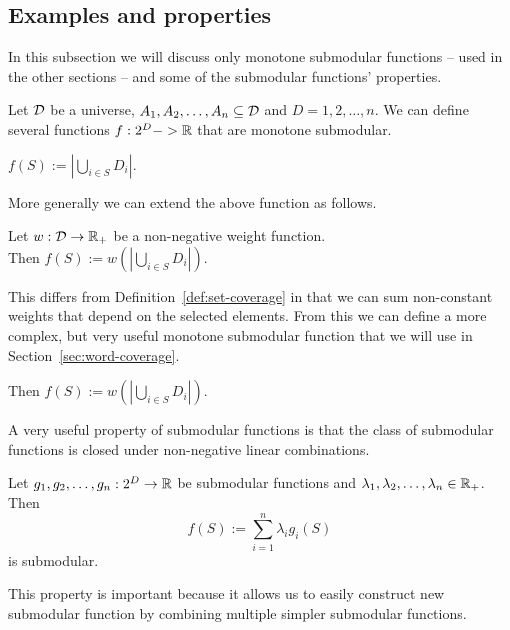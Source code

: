 
\subsection{Examples and properties}

In this subsection we will discuss only monotone submodular functions --
used in the other sections -- and some of the submodular functions'
properties.

Let \(\mathcal{D}\) be a universe, \(A_1, A_2, \ldots, A_n \subseteq \mathcal{D}\) and \(D = {1,
2, \dots, n}\). We can define several functions \(f : 2^D -> \mathbb{R}\) that are
monotone submodular. 
\begin{definition}
  \label{def:set-coverage}
  \(f(S) := |\bigcup_{i \in S} D_i|\).
\end{definition}
More generally we can extend the above function as follows.
\begin{definition}
  \label{def:weighted-coverage}
  Let \(w : \mathcal{D} \to \mathbb{R}_+\) be a non-negative weight function. \\
  Then \(f(S) := w(|\bigcup_{i \in S} D_i|)\).
\end{definition}
This differs from Definition~\ref{def:set-coverage} in that we can sum
non-constant weights that depend on the selected elements. From this we can
define a more complex, but very useful monotone submodular function that we will
use in Section~\ref{sec:word-coverage}.
\begin{definition}
  \label{def:-coverage}
  Then \(f(S) := w(|\bigcup_{i \in S} D_i|)\).
\end{definition}

A very useful property of submodular functions is that the class of submodular
functions is closed under non-negative linear combinations. 
\begin{proposition}
  Let \(g_1, g_2, \ldots, g_n : 2^D \to \mathbb{R} \) be submodular functions and \(\lambda_1, \lambda_2, \ldots, \lambda_n \in \mathbb{R}_+\). \\
  Then
  \[f(S) := \sum_{i=1}^n \lambda_i g_i(S)\]
  is submodular.
\end{proposition}
This property is important because it allows us to easily construct new
submodular function by combining multiple simpler submodular functions.

